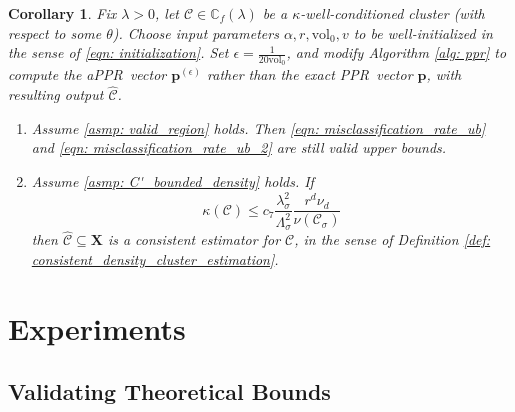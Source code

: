 \documentclass{article}
\newcommand{\vol}{\mathrm{vol}}
\newcommand{\1}{\mathbf{1}}
\newcommand{\pbf}{\mathbf{p}}
\newcommand{\Xbf}{\mathbf{X}}
\newcommand{\Cbb}{\mathbb{C}}
\newcommand{\Cset}{\mathcal{C}}
\newcommand{\Csig}{\Cset_{\sigma}}
\newcommand{\pprspace}{{\sc PPR~}}
\theoremstyle{aldenthm}
\newtheorem{corollary}{Corollary}
\theoremstyle{aldenrmrk}
\begin{document}
\begin{corollary}
	\label{cor: appr}
	Fix $\lambda > 0$, let $\Cset \in \Cbb_f(\lambda)$ be a $\kappa$-well-conditioned cluster (with respect to some $\theta$). Choose input parameters $\alpha, r, \vol_0, v$ to be well-initialized in the sense of \eqref{eqn: initialization}. Set $\epsilon = \frac{1}{20 \vol_0}$, and modify Algorithm \ref{alg: ppr} to compute the a\pprspace vector $\pbf^{(\epsilon)}$ rather than the exact \pprspace vector $\pbf$, with resulting output $\widehat{\Cset}$.
	\begin{enumerate}
		\item Assume \ref{asmp: valid_region} holds. Then \eqref{eqn: misclassification_rate_ub} and \eqref{eqn: misclassification_rate_ub_2} are still valid upper bounds.
		\item Assume \ref{asmp: C'_bounded_density} holds. If
		\begin{equation*}
		\kappa(\Cset) \leq c_7 \frac{\lambda_{\sigma}^2}{\Lambda_{\sigma}^2} \frac{r^d \nu_d}{\nu(\Csig)}
		\end{equation*}
		then $\widehat{\Cset} \subseteq \Xbf$ is a consistent estimator for $\Cset$, in the sense of Definition \ref{def: consistent_density_cluster_estimation}.
	\end{enumerate}
\end{corollary}

\section{Experiments}
\label{sec: experiments}

\subsection{Validating Theoretical Bounds}
\end{document}
